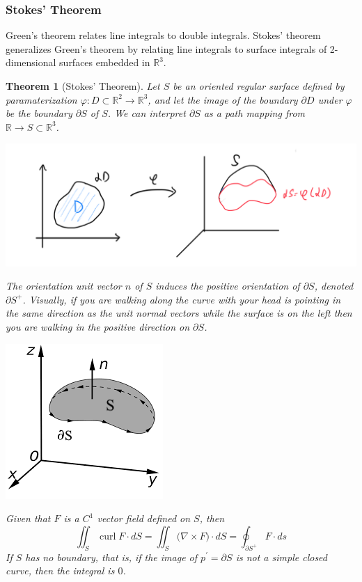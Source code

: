 \documentclass{article}
\DeclareMathOperator{\curl}{curl}
\newtheorem{theorem}{Theorem}[section]
\theoremstyle{remark}
\theoremstyle{definition}
\begin{document}
\subsubsection{Stokes' Theorem}
Green's theorem relates line integrals to double integrals. Stokes' theorem generalizes Green's theorem by relating line integrals to surface integrals of 2-dimensional surfaces embedded in $\mathbb{R}^3$. 

\begin{theorem}[Stokes' Theorem]
Let $S$ be an oriented regular surface defined by paramaterization $\varphi: D \subset \mathbb{R}^2 \longrightarrow \mathbb{R}^3$, and let the image of the boundary $\partial D$ under $\varphi$ be the boundary $\partial S$ of $S$. We can interpret $\partial S$ as a path mapping from $\mathbb{R} \longrightarrow S \subset \mathbb{R}^3$. 
\begin{center}
  \includegraphics[scale=0.27]{img/Boundary_Mapping.PNG}
\end{center}
The orientation unit vector $n$ of $S$ induces the positive orientation of $\partial S$, denoted $\partial S^+$. Visually, if you are walking along the curve with your head is pointing in the same direction as the unit normal vectors while the surface is on the left then you are walking in the positive direction on $\partial S$. 
\begin{center}
    \includegraphics[scale=0.8]{img/Stokes_Theorem_Orientation.png}
\end{center}
Given that $F$ is a $C^1$ vector field defined on $S$, then
\[\iint_S \curl{F} \cdot dS = \iint_S \big( \nabla \times F \big) \cdot d S = \oint_{\partial S^+} F \cdot d s\]
If $S$ has no boundary, that is, if the image of $p^\prime = \partial S$ is not a simple closed curve, then the integral is $0$. 
\end{theorem}
\end{document}
